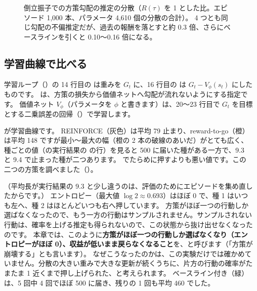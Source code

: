 \begin{figure}[tbp]
\centering
{}
\caption{倒立振子での方策勾配の推定の分散（$R(\tau)$ を 1 とした比。エピソード 1,000 本、パラメータ 4,610 個の分散の合計）。
4 つとも同じ勾配の不偏推定だが、過去の報酬を落とすと約 0.3 倍、さらにベースラインを引くと 0.10〜0.16 倍になる。}
\label{fig:pg-grad-variance}
\end{figure}

\subsection*{学習曲線で比べる}

学習ループ（）の 14 行目の  は重みを $G_t$ に、16 行目の  は $G_t-V_\phi(s_t)$ にしたものです。
 は、方策の損失から価値ネットへ勾配が流れないようにする指定です。
価値ネット $V_\phi$（パラメータを $\phi$ と書きます）は、20〜23 行目で $G_t$ を目標とする二乗誤差の回帰（）で学習します。

が学習曲線です。
REINFORCE（灰色）は平均 79 止まり、reward-to-go（橙）は平均 148 ですが最小〜最大の幅（橙の 2 本の破線のあいだ）がとても広く、
種ごとの値（の実行結果の  の行）を見ると 500 に届いた種がある一方で、9.3 と 9.4 で止まった種が二つあります。
でたらめに押すよりも悪い値です。この二つの方策を調べました（）。


（平均長が実行結果の 9.3 と少し違うのは、評価のためにエピソードを集め直したからです。）
エントロピー（最大値 $\log2\approx0.693$）はほぼ 0 で、種 1 はいつも左へ、種 2 はほとんどいつも右へ押しています。
方策がほぼ一つの行動しか選ばなくなったので、もう一方の行動はサンプルされません。サンプルされない行動は、確率を上げる推定も得られないので、この状態から抜け出せなくなったのです。
本章では、このように\textbf{方策がほぼ一つの行動しか選ばなくなり（エントロピーがほぼ 0）、収益が低いまま戻らなくなること}を、と呼びます（「方策が崩壊する」とも言います）。
なぜこうなったのかは、この実験だけでは確かめていません。分散の大きい重みで大きな更新が続くうちに、片方の行動の確率がたまたま 1 近くまで押し上げられた、と考えられます。
ベースライン付き（緑）は、5 回中 4 回でほぼ 500 に届き、残りの 1 回も平均 460 でした。


